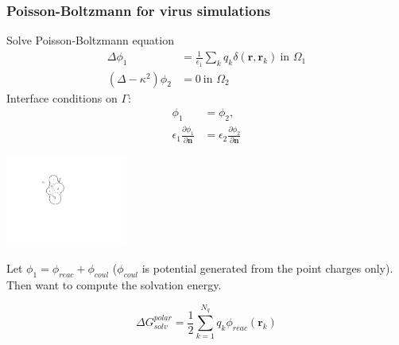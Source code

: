 \documentclass[dvipsnames,10pt]{beamer}
\begin{document}
\begin{frame}
    \frametitle{Poisson-Boltzmann for virus simulations}

    \vspace{.3cm}

    \begin{minipage}{5cm}
        Solve Poisson-Boltzmann equation
        \begin{align}
            \Delta\phi_1 &= \frac{1}{\epsilon_1}\sum_{k}q_k\delta(\mathbf{r}, \mathbf{r}_k)~\text{in }\Omega_1\nonumber\\
            (\Delta - \kappa^2)\phi_2 &= 0~\text{in }\Omega_2\nonumber
        \end{align}
        Interface conditions on $\Gamma$:
        \begin{align}
            \phi_1 &= \phi_2,\nonumber\\
            \epsilon_1\frac{\partial\phi_1}{\partial\mathbf{n}} &= \epsilon_2\frac{\partial\phi_2}{\partial \mathbf{n}}\nonumber
    \end{align}

    \end{minipage}
    \begin{minipage}{5cm}
        \includegraphics[width=4cm]{../figs/implicit_solvent.pdf}
    \end{minipage}
    Let $\phi_1 = \phi_{reac} + \phi_{coul}$ ($\phi_{coul}$ is potential generated from the point charges only). Then
    want to compute the solvation energy.
    \begin{tcolorbox}
        $$
        \Delta G_{solv}^{polar} = \frac{1}{2}\sum_{k=1}^{N_q}q_k\phi_{reac}(\mathbf{r}_k)
        $$
    \end{tcolorbox}

\end{frame}
\end{document}
